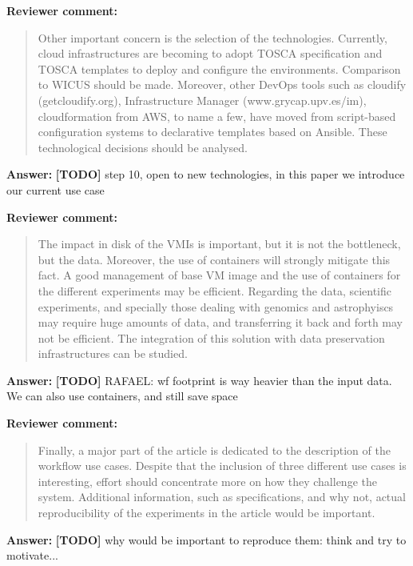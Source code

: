\documentclass{letter}
\newenvironment{review}%
{\textbf{Reviewer comment:}\begin{quote}}%
{\end{quote}}%
\newcommand{\todo}[1]{%
      \color{red}\textbf{[TODO]} #1\color{black}}
\newcommand{\answer}[1]{%
      \textbf{Answer:} #1}
\newcommand{\revised}[1]{\emph{#1}\color{black}}
\begin{document}
\begin{letter}{}
\revised{}


\begin{review}
Other important concern is the selection of the technologies. Currently, cloud infrastructures are becoming to adopt TOSCA specification and TOSCA templates to deploy and configure the environments. Comparison to WICUS should be made. Moreover, other DevOps tools such as cloudify (getcloudify.org), Infrastructure Manager (www.grycap.upv.es/im), cloudformation from AWS, to name a few, have moved from script-based configuration systems to declarative templates based on Ansible. These technological decisions should be analysed.
\end{review}

\answer{\todo{step 10, open to new technologies, in this paper we introduce our current use case}}


\begin{review}
The impact in disk of the VMIs is important, but it is not the bottleneck, but the data. Moreover, the use of containers will strongly mitigate this fact. A good management of base VM image and the use of containers for the different experiments may be efficient. Regarding the data, scientific experiments, and specially those dealing with genomics and astrophyiscs may require huge amounts of data, and transferring it back and forth may not be efficient. The integration of this solution with data preservation infrastructures can be studied.
\end{review}

\answer{\todo{RAFAEL: wf footprint is way heavier than the input data. We can also use containers, and still save space}}


\begin{review}
Finally, a major part of the article is dedicated to the description of the workflow use cases. Despite that the inclusion of three different use cases is interesting, effort should concentrate more on how they challenge the system. Additional information, such as specifications, and why not, actual reproducibility of the experiments in the article would be important.
\end{review}

\answer{\todo{why would be important to reproduce them: think and try to motivate...}}


\end{letter}
\end{document}
